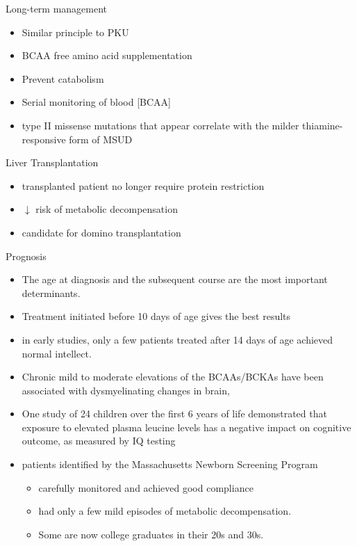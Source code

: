 \documentclass[presentation, smaller]{beamer}
\begin{document}
\begin{frame}[label={sec:orgheadline21}]{Long-term management}
\begin{itemize}
\item Similar principle to PKU
\item BCAA free amino acid supplementation
\item Prevent catabolism
\item Serial monitoring of blood [BCAA]

\item type II missense mutations that appear correlate with the milder
thiamine-responsive form of MSUD
\end{itemize}


\begin{block}{Liver Transplantation}
\begin{itemize}
\item transplanted patient no longer require protein restriction
\item \(\downarrow\) risk of metabolic decompensation
\item candidate for domino transplantation
\end{itemize}
\end{block}
\end{frame}

\begin{frame}[label={sec:orgheadline22}]{Prognosis}
\begin{itemize}
\item The age at diagnosis and the subsequent course are the most
important determinants.
\item Treatment initiated before 10 days of age gives the best results
\item in early studies, only a few patients treated after 14 days of age
achieved normal intellect.
\item Chronic mild to moderate elevations of the BCAAs/BCKAs have been
associated with dysmyelinating changes in brain,
\item One study of 24 children over the first 6 years of life demonstrated
that exposure to elevated plasma leucine levels has a negative
impact on cognitive outcome, as measured by IQ testing
\item patients identified by the Massachusetts Newborn Screening Program
\begin{itemize}
\item carefully monitored and achieved good compliance
\item had only a few mild episodes of metabolic decompensation.
\item Some are now college graduates in their 20s and 30s.
\end{itemize}
\end{itemize}
\end{frame}
\end{document}
